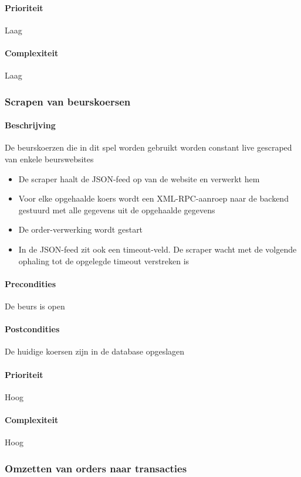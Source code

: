 \paragraph{Prioriteit}Laag
\paragraph{Complexiteit}Laag


\subsubsection{Scrapen van beurskoersen}

\paragraph{Beschrijving} De beurskoerzen die in dit spel worden gebruikt worden constant live gescraped van enkele beurswebsites

\begin{itemize}
	\item De scraper haalt de JSON-feed op van de website en verwerkt hem
  \item Voor elke opgehaalde koers wordt een XML-RPC-aanroep naar de backend gestuurd met alle gegevens uit de opgehaalde gegevens
  \item De order-verwerking wordt gestart
  \item In de JSON-feed zit ook een timeout-veld. De scraper wacht met de volgende ophaling tot de opgelegde timeout verstreken is
\end{itemize}
\paragraph{Precondities} De beurs is open
\paragraph{Postcondities} De huidige koersen zijn in de database opgeslagen
\paragraph{Prioriteit}Hoog
\paragraph{Complexiteit}Hoog

\subsubsection{Omzetten van orders naar transacties}

